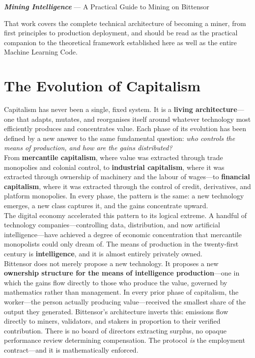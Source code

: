 \documentclass[12pt, a4paper, oneside]{report}
\theoremstyle{definition}
\begin{document}
\begin{center}
\textit{\textbf{Mining Intelligence}} — A Practical Guide to Mining on Bittensor
\end{center}

That work covers the complete technical architecture of becoming a miner, 
from first principles to production deployment, and should be read as the 
practical companion to the theoretical framework established here as well as the entire Machine Learning Code.

\chapter{The Evolution of Capitalism}
\label{chap:evolution}

Capitalism has never been a single, fixed system. It is a \textbf{living 
architecture}—one that adapts, mutates, and reorganises itself around whatever 
technology most efficiently produces and concentrates value. Each phase of its 
evolution has been defined by a new answer to the same fundamental question: 
\textit{who controls the means of production, and how are the gains distributed?}\\[0.4cm]

From \textbf{mercantile capitalism}, where value was extracted through trade 
monopolies and colonial control, to \textbf{industrial capitalism}, where it 
was extracted through ownership of machinery and the labour of wages—to 
\textbf{financial capitalism}, where it was extracted through the control of 
credit, derivatives, and platform monopolies. In every phase, the pattern is 
the same: a new technology emerges, a new class captures it, and the gains 
concentrate upward.\\[0.4cm]

The digital economy accelerated this pattern to its logical extreme. A handful 
of technology companies—controlling data, distribution, and now artificial 
intelligence—have achieved a degree of economic concentration that mercantile 
monopolists could only dream of. The means of production in the twenty-first 
century is \textbf{intelligence}, and it is almost entirely privately owned.\\[0.4cm]

Bittensor does not merely propose a new technology. It proposes a new 
\textbf{ownership structure for the means of intelligence production}—one 
in which the gains flow directly to those who produce the value, governed 
by mathematics rather than management. In every prior phase of capitalism, 
the worker—the person actually producing value—received the smallest share 
of the output they generated. Bittensor's architecture inverts this: emissions 
flow directly to miners, validators, and stakers in proportion to their verified 
contribution. There is no board of directors extracting surplus, no opaque 
performance review determining compensation. The protocol \emph{is} the 
employment contract—and it is mathematically enforced.\\[0.4cm]
\end{document}
